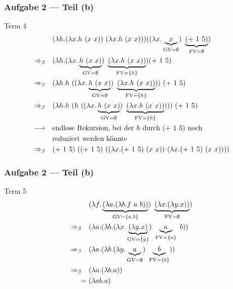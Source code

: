 \documentclass{beamer}
\DeclareMathOperator{\GV}{GV}
\DeclareMathOperator{\FV}{FV}
\begin{document}
\begin{frame}[t] \frametitle{Aufgabe 2 --- Teil (b)}
	\small
	Term 4
	\begin{align*}
		& (\lambda h . (\lambda x . h \ (x \ x)) \ (\lambda x . h \ (x \ x))) ((\lambda x . \underbrace{x}_{\GV = \emptyset}) \ \underbrace{(+ \ 1 \ 5)}_{ \FV = \emptyset})
		\\
		\Rightarrow_\beta \quad
		& (\lambda h . (\lambda x . \underbrace{h \ (x \ x)}_{\GV = \emptyset}) \ \underbrace{(\lambda x . h \ (x \ x))}_{\FV = \menge{h}}) (+ \ 1 \ 5)
		\\
		\Rightarrow_\beta \quad
		& (\lambda h . h \ ((\lambda x . \underbrace{h \ (x \ x)}_{\GV = \emptyset}) \ \underbrace{(\lambda x . h \ (x \ x))}_{\FV= \menge{h}})) \ (+ \ 1 \ 5)
		\\
		\Rightarrow_\beta \quad
		& (\lambda h . h \ ( h \ ((\lambda x . \underbrace{h \ (x \ x)}_{\GV = \emptyset}) \ \underbrace{(\lambda x . h \ (x \ x))}_{\FV= \menge{h}}))) \ (+ \ 1 \ 5)
		\\
		\longrightarrow \quad
		&\text{endlose Rekursion, bei der $h$ durch $(+ \ 1 \ 5 )$ noch} \\
		&\text{reduziert werden könnte}
		\\
		\Rightarrow_\beta \quad
		& (+ \ 1 \ 5) \ ( (+ \ 1 \ 5) \ ((\lambda x . (+ \ 1 \ 5 ) \ (x \ x)) \ (\lambda x . (+ \ 1 \ 5 ) \ (x \ x))))	
	\end{align*}
\end{frame}

\begin{frame}[t] \frametitle{Aufgabe 2 --- Teil (b)}
	Term 5
	\begin{align*}
		& (\lambda f . \underbrace{(\lambda a . (\lambda b . f \ a \ b))}_{\GV = \menge{a,b}}) \ \underbrace{(\lambda x . (\lambda y . x ))}_{\FV= \emptyset}) 
		\\
		\Rightarrow_\beta \quad
		& (\lambda a . (\lambda b . (\lambda x . \underbrace{(\lambda y . x )}_{\GV = \menge{y}}) \ \underbrace{a}_{\FV = \menge{a}} \ b)) 
		\\
		\Rightarrow_\beta \quad
		& (\lambda a . (\lambda b . (\lambda y . \underbrace{a}_{\GV = \emptyset}) \ \underbrace{b}_{\FV = \menge{b}})) 
		\\
		\Rightarrow_\beta \quad
		& (\lambda a . (\lambda b . a)) 
		\\
		= \ & (\lambda ab . a)
	\end{align*}
\end{frame}
\end{document}
